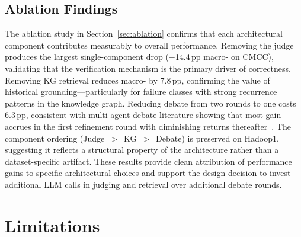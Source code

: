 \subsection{Ablation Findings}

The ablation study in Section~\ref{sec:ablation} confirms that each architectural component
contributes measurably to overall performance. Removing the judge produces the largest
single-component drop ($-$14.4\,pp macro-\fone{} on CMCC), validating that the verification
mechanism is the primary driver of correctness. Removing KG retrieval reduces macro-\fone{}
by 7.8\,pp, confirming the value of historical grounding---particularly for failure classes
with strong recurrence patterns in the knowledge graph. Reducing debate from two rounds to
one costs 6.3\,pp, consistent with multi-agent debate literature showing that most gain
accrues in the first refinement round with diminishing returns
thereafter~\cite{du2023improvingfactualityreasoninglanguage}. The component ordering
(Judge~$>$~KG~$>$~Debate) is preserved on Hadoop1, suggesting it reflects a structural
property of the architecture rather than a dataset-specific artifact. These results provide
clean attribution of performance gains to specific architectural choices and support the
design decision to invest additional LLM calls in judging and retrieval over additional
debate rounds.

\section{Limitations}

